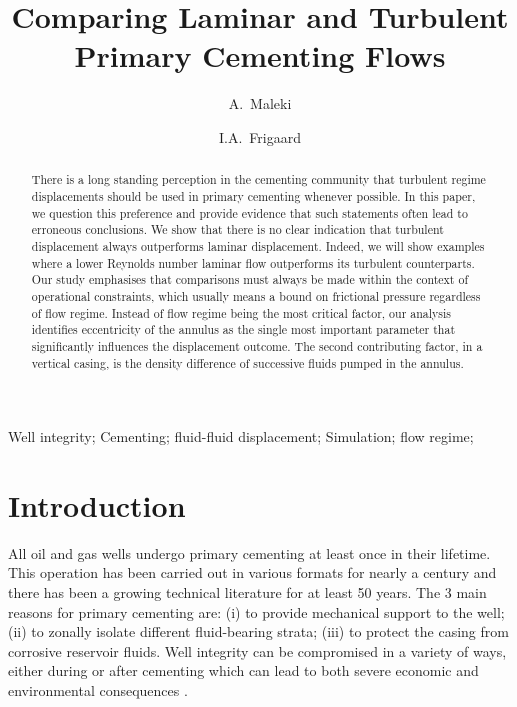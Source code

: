 \documentclass[review]{elsarticle}
\begin{document}

\begin{frontmatter}
\title{Comparing Laminar and Turbulent Primary Cementing Flows}

\author{A.~Maleki}
\address{Department of Mechanical Engineering, University of British Columbia, 2054-6250 Applied Science Lane, Vancouver, BC, Canada V6T 1Z4.}

\author{I.A.~Frigaard}
\address{Departments of Mathematics and Mechanical Engineering, University of British Columbia, 1984 Mathematics Road, Vancouver, BC, Canada, V6T 1Z2.\\ Tel: 1-604-822-3043; e-mail: frigaard@math.ubc.ca}

\begin{abstract}
There is a long standing perception in the cementing community that turbulent regime displacements should be used in primary cementing whenever possible. In this paper, we question this preference and provide evidence that such statements often lead to erroneous conclusions. We show that there is no clear indication that turbulent displacement always outperforms laminar displacement. Indeed, we will show examples where a lower Reynolds number laminar flow outperforms its turbulent counterparts. Our study emphasises that comparisons must always be made within the context of operational constraints, which usually means a bound on frictional pressure regardless of flow regime. Instead of flow regime being the most critical factor, our analysis identifies eccentricity of the annulus as the single most important parameter that significantly influences the displacement outcome. The second contributing factor, in a vertical casing, is the density difference of successive fluids pumped in the annulus.
\end{abstract}

\medskip
\begin{keyword}
Well integrity; Cementing; fluid-fluid displacement; Simulation; flow regime;
\end{keyword}
\end{frontmatter}


\section{Introduction}
\label{sec:intro}

All oil and gas wells undergo primary cementing at least once in their lifetime. This operation has been carried out in various formats for nearly a century and there has been a growing technical literature for at least 50 years. The 3 main reasons for primary cementing are: (i) to provide mechanical support to the well; (ii) to zonally isolate different fluid-bearing strata; (iii) to protect the casing from corrosive reservoir fluids. Well integrity can be compromised in a variety of ways, either during or after cementing \citep{Bonett1996} which can lead to both severe economic \citep{smith1984,Watson2004} and environmental consequences \citep{chafin1994,Armstrong2002,Karion2013}.
\end{document}
